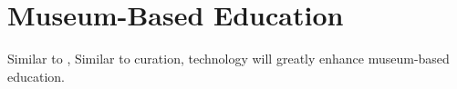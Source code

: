 \documentclass[10pt]{article}
\begin{document}
\section*{Museum-Based Education}
Similar to , 
Similar to curation, technology will greatly enhance museum-based education.


\end{document}
